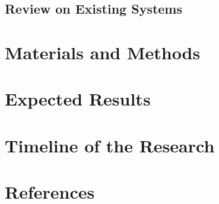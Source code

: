 \documentclass{article}
\begin{document}
\subsection{Review on Existing Systems}


\section{Materials and Methods}

\section{Expected Results}


\section{Timeline of the Research}



\section{References}
\end{document}

